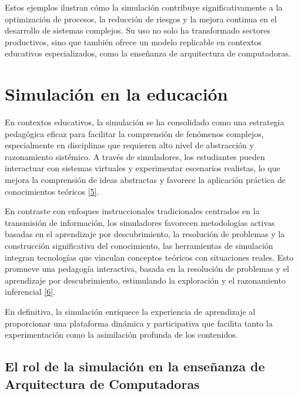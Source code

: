 \documentclass[12pt,oneside]{templates/unerthesis}
\begin{document}
Estos ejemplos ilustran cómo la simulación contribuye significativamente a la optimización de procesos, la reducción de riesgos y la mejora continua en el desarrollo de sistemas complejos. Su uso no solo ha transformado sectores productivos, sino que también ofrece un modelo replicable en contextos educativos especializados, como la enseñanza de arquitectura de computadoras.

\hypertarget{simulaciuxf3n-en-la-educaciuxf3n}{%
\section{Simulación en la educación}\label{simulaciuxf3n-en-la-educaciuxf3n}}

En contextos educativos, la simulación se ha consolidado como una estrategia pedagógica eficaz para facilitar la comprensión de fenómenos complejos, especialmente en disciplinas que requieren alto nivel de abstracción y razonamiento sistémico. A través de simuladores, los estudiantes pueden interactuar con sistemas virtuales y experimentar escenarios realistas, lo que mejora la comprensión de ideas abstractas y favorece la aplicación práctica de conocimientos teóricos \protect\hyperlink{ref-lion_simuladores_2005}{{[}5{]}}.

En contraste con enfoques instruccionales tradicionales centrados en la transmisión de información, los simuladores favorecen metodologías activas basadas en el aprendizaje por descubrimiento, la resolución de problemas y la construcción significativa del conocimiento, las herramientas de simulación integran tecnologías que vinculan conceptos teóricos con situaciones reales. Esto promueve una pedagogía interactiva, basada en la resolución de problemas y el aprendizaje por descubrimiento, estimulando la exploración y el razonamiento inferencial \protect\hyperlink{ref-contreras_uso_2010}{{[}6{]}}.

En definitiva, la simulación enriquece la experiencia de aprendizaje al proporcionar una plataforma dinámica y participativa que facilita tanto la experimentación como la asimilación profunda de los contenidos.

\hypertarget{el-rol-de-la-simulaciuxf3n-en-la-enseuxf1anza-de-arquitectura-de-computadoras}{%
\subsection{El rol de la simulación en la enseñanza de Arquitectura de Computadoras}\label{el-rol-de-la-simulaciuxf3n-en-la-enseuxf1anza-de-arquitectura-de-computadoras}}
\end{document}
